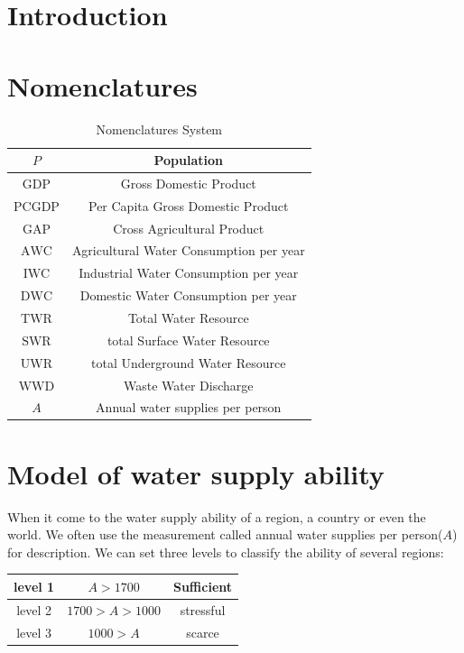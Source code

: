 
\section{Introduction}

\section{Nomenclatures}

\begin{table}[!htb]
  \caption{Nomenclatures System}
  \centering
  \begin{tabular}{||c|c||}
    \hline
    $P$   & Population \\
    \hline
    $\text{GDP}$ & Gross Domestic Product \\
    \hline
    $\text{PCGDP}$ & Per Capita Gross Domestic Product \\
    \hline
    $\text{GAP}$ & Cross Agricultural Product \\
    \hline
    $\text{AWC}$ & Agricultural Water Consumption per year \\
    \hline
    $\text{IWC}$ & Industrial Water Consumption per year \\
    \hline
    $\text{DWC}$ & Domestic Water Consumption per year \\
    \hline
    $\text{TWR}$ & Total Water Resource \\
    \hline
    $\text{SWR}$ & total Surface Water Resource \\
    \hline
    $\text{UWR}$ & total Underground Water Resource \\
    \hline

    $\text{WWD}$ & Waste Water Discharge \\
    \hline

    $A$          & Annual water supplies per person \\
    \hline
  \end{tabular}
\end{table}

\section{Model of water supply ability}
  When it come to the water supply ability of a region, a country or even the world. We often use the measurement called annual water supplies per person($A$) for description\cite{AbilityMeasure}. We can set three levels to classify the ability of several regions:
  \begin{table}[!htb]
    \centering
    \begin{tabular}{|c||c|c|}
    \hline
    level 1   & $A>1700$ & Sufficient \\
    \hline
    level 2   & $1700>A>1000$ & stressful \\
    \hline
    level 3   & $1000>A$ & scarce \\
    \hline
    \end{tabular}
  \end{table}

